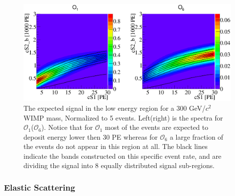\begin{figure}[h!]
\begin{minipage}{1.\linewidth}
\centerline{\includegraphics[width=1.\linewidth]{Figures/SigLowO1O6.eps}}
\end{minipage}
\caption{The expected signal in the low energy region for a 300 GeV/$c^2$ WIMP mass, Normalized to 5 events. Left(right) is the spectra for $\mathcal{O}_1$($\mathcal{O}_6$). Notice that for $\mathcal{O}_1$ most of the events are expected to deposit energy lower then 30 PE whereas for $\mathcal{O}_6$ a large fraction of the events do not appear in this region at all. The black lines indicate the bands constructed on this specific event rate, and are dividing the signal into 8 equally distributed signal sub-regions.}
\label{fig:LowE}
\end{figure}




%

\subsubsection{Elastic Scattering}
\label{subsubsec:Elastic}

